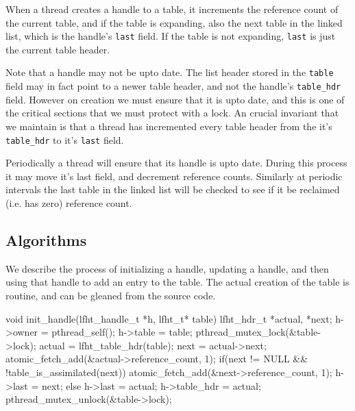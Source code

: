 When a thread creates a handle to a table, it increments the reference
count of the current table, and if the table is expanding, also the
next table in the linked list, which is the handle's \texttt{last} field.  If
the table is not expanding, \texttt{last} is just the current table header.

Note that a handle may not be upto date. The list
header stored in the \texttt{table} field may in fact point to a newer table header,
and not the handle's \texttt{table\_hdr}
field. However on creation we must ensure that it is upto date, and
this is one of the critical sections that we must protect with a lock.
An crucial invariant that we maintain is that a thread has incremented
every table header from the it's \texttt{table\_hdr} to it's \texttt{last}
field.

Periodically a thread will ensure that its handle is upto date. During this process
it may move it's last field, and decrement reference counts. Similarly
at periodic intervals the last table in the linked list will be checked to see
if it be reclaimed (i.e. has zero) reference count.


\subsection{Algorithms}


We describe the process of initializing a handle, updating a handle, and then using that handle
to add an entry to the table. The actual creation of the table is routine,
and can be gleaned from the source code\cite{lfht2017}.

\begin{center}
\begin{clisting}
void init_handle(lfht_handle_t *h, lfht_t* table){
  lfht_hdr_t *actual, *next;
  h->owner = pthread_self();
  h->table = table;
  pthread_mutex_lock(&table->lock);
  actual = lfht_table_hdr(table);
  next = actual->next;
  atomic_fetch_add(&actual->reference_count, 1);
  if(next != NULL && !table_is_assimilated(next)){
    atomic_fetch_add(&next->reference_count, 1);
    h->last = next;
  } else {
    h->last = actual;
  }
  h->table_hdr = actual;
  pthread_mutex_unlock(&table->lock);
}
\end{clisting}
\end{center}

